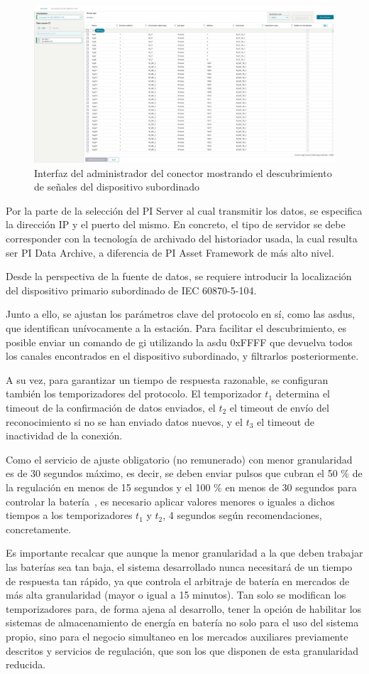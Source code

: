 \begin{figure}
  \centering
  \includegraphics[width=0.5\linewidth]{figures/administador-del-conector.png}
  \caption{Interfaz del administrador del conector mostrando el descubrimiento de señales del dispositivo subordinado}
  \label{fig:administador-del-conector}
\end{figure}

Por la parte de la selección del PI Server al cual transmitir los datos, se especifica la dirección IP y el puerto del mismo. En concreto, el tipo de servidor se debe corresponder con la tecnología de archivado del historiador usada, la cual resulta ser PI Data Archive, a diferencia de PI Asset Framework de más alto nivel.

Desde la perspectiva de la fuente de datos, se requiere introducir la localización del dispositivo primario subordinado de IEC 60870-5-104.

Junto a ello, se ajustan los parámetros clave del protocolo en sí, como las \glspl{asdu}, que identifican unívocamente a la estación. Para facilitar el descubrimiento, es posible enviar un comando de \gls{gi} utilizando la \gls{asdu} 0xFFFF que devuelva todos los canales encontrados en el dispositivo subordinado, y filtrarlos posteriormente.

A su vez, para garantizar un tiempo de respuesta razonable, se configuran también los temporizadores del protocolo. El temporizador \( t_1 \) determina el timeout de la confirmación de datos enviados, el \( t_2 \) el timeout de envío del reconocimiento si no se han enviado datos nuevos, y el \( t_3 \) el timeout de inactividad de la conexión.

Como el servicio de ajuste obligatorio (no remunerado) con menor granularidad es de 30 segundos máximo, es decir, se deben enviar pulsos que cubran el 50 \% de la regulación en menos de 15 segundos y el 100 \% en menos de 30 segundos para controlar la batería~\cite{cnmc2024balance}, es necesario aplicar valores menores o iguales a dichos tiempos a los temporizadores \( t_1 \) y \( t_2 \), 4 segundos según recomendaciones, concretamente.

Es importante recalcar que aunque la menor granularidad a la que deben trabajar las baterías sea tan baja, el sistema desarrollado nunca necesitará de un tiempo de respuesta tan rápido, ya que controla el arbitraje de batería en mercados de más alta granularidad (mayor o igual a 15 minutos). Tan solo se modifican los temporizadores para, de forma ajena al desarrollo, tener la opción de habilitar los sistemas de almacenamiento de energía en batería no solo para el uso del sistema propio, sino para el negocio simultaneo en los mercados auxiliares previamente descritos y servicios de regulación, que son los que disponen de esta granularidad reducida.

